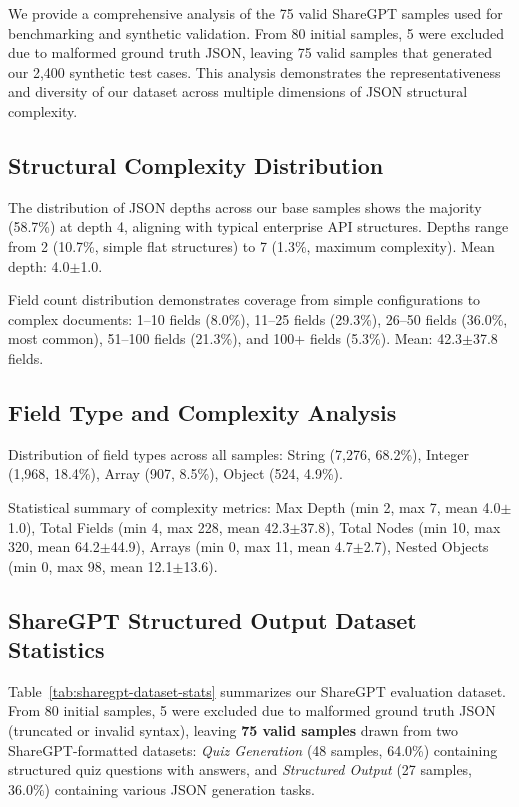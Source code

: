 \documentclass{article}
\theoremstyle{plain}
\theoremstyle{definition}
\begin{document}
We provide a comprehensive analysis of the 75 valid ShareGPT samples used for benchmarking and synthetic validation. From 80 initial samples, 5 were excluded due to malformed ground truth JSON, leaving 75 valid samples that generated our 2,400 synthetic test cases. This analysis demonstrates the representativeness and diversity of our dataset across multiple dimensions of JSON structural complexity.

\subsection{Structural Complexity Distribution}
\label{subsec:structural-complexity}

The distribution of JSON depths across our base samples shows the majority (58.7\%) at depth 4, aligning with typical enterprise API structures. Depths range from 2 (10.7\%, simple flat structures) to 7 (1.3\%, maximum complexity). Mean depth: 4.0$\pm$1.0.

Field count distribution demonstrates coverage from simple configurations to complex documents: 1--10 fields (8.0\%), 11--25 fields (29.3\%), 26--50 fields (36.0\%, most common), 51--100 fields (21.3\%), and 100+ fields (5.3\%). Mean: 42.3$\pm$37.8 fields.

\subsection{Field Type and Complexity Analysis}
\label{subsec:field-type-analysis}

Distribution of field types across all samples: String (7,276, 68.2\%), Integer (1,968, 18.4\%), Array (907, 8.5\%), Object (524, 4.9\%).

Statistical summary of complexity metrics: Max Depth (min 2, max 7, mean 4.0$\pm$1.0), Total Fields (min 4, max 228, mean 42.3$\pm$37.8), Total Nodes (min 10, max 320, mean 64.2$\pm$44.9), Arrays (min 0, max 11, mean 4.7$\pm$2.7), Nested Objects (min 0, max 98, mean 12.1$\pm$13.6).

\subsection{ShareGPT Structured Output Dataset Statistics}
\label{subsec:sharegpt-statistics}

Table~\ref{tab:sharegpt-dataset-stats} summarizes our ShareGPT evaluation dataset. From 80 initial samples, 5 were excluded due to malformed ground truth JSON (truncated or invalid syntax), leaving \textbf{75 valid samples} drawn from two ShareGPT-formatted datasets: \textit{Quiz Generation} (48 samples, 64.0\%) containing structured quiz questions with answers, and \textit{Structured Output} (27 samples, 36.0\%) containing various JSON generation tasks.
\end{document}
